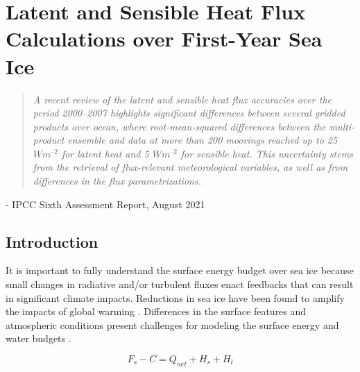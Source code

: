\chapter{Latent and Sensible Heat Flux Calculations over First-Year Sea Ice}
\vspace{1 cm}
\begin{spacing}{1} \begin{quote} 
\noindent \emph{A recent review of the latent and sensible heat flux accuracies over the period 2000–2007 highlights significant differences between several gridded products over ocean, where root-mean-squared differences between the multi-product ensemble and data at more than 200  moorings reached up to 25 $W m^{–2}$ for latent heat and 5 $W m^{–2}$ for sensible heat. This uncertainty stems from the retrieval of flux-relevant meteorological variables, as well as from differences in the flux parametrizations.} \end{quote}
\hspace{6 cm} - IPCC Sixth Assessment Report, August 2021  
\end{spacing}
\doublespacing
\section{Introduction}

It is important to fully understand the surface energy budget over sea ice because small changes in radiative and/or turbulent fluxes enact feedbacks that can result in significant climate impacts. Reductions in sea ice have been found to amplify the impacts of global warming \citep{wunderling:2020, ipcc_techsum}. Differences in the surface features and atmospheric conditions present challenges for modeling the surface energy and water budgets \citep{wang:2009}. 

\begin{equation}\label{eq:seb}
F_{s} - C = Q_{net} + H_{s} + H_{l}
\end{equation}

